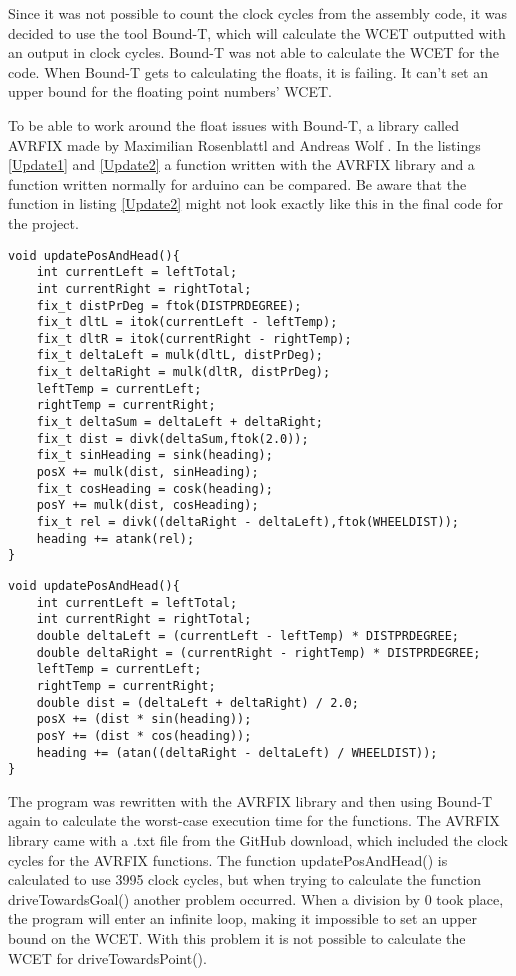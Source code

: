 Since it was not possible to count the clock cycles from the assembly code, it was decided to use the tool Bound-T, which will calculate the WCET outputted with an output in clock cycles. \newline
Bound-T was not able to calculate the WCET for the code. When Bound-T gets to calculating the floats, it is failing. It can't set an upper bound for the floating point numbers' WCET.

To be able to work around the float issues with Bound-T, a library called AVRFIX made by Maximilian Rosenblattl and Andreas Wolf \citep{AVRFIX}. In the listings \ref{Update1} and \ref{Update2} a function written with the AVRFIX library and a function written normally for arduino can be compared. Be aware that the function in listing \ref{Update2} might not look exactly like this in the final code for the project. 

\begin{lstlisting}[caption={The function updatePosAndHead with AWRFIX library}, label={Update1}]
void updatePosAndHead(){
	int currentLeft = leftTotal;
	int currentRight = rightTotal;
	fix_t distPrDeg = ftok(DISTPRDEGREE);
	fix_t dltL = itok(currentLeft - leftTemp);
	fix_t dltR = itok(currentRight - rightTemp);
	fix_t deltaLeft = mulk(dltL, distPrDeg);
	fix_t deltaRight = mulk(dltR, distPrDeg);
	leftTemp = currentLeft;
	rightTemp = currentRight;
	fix_t deltaSum = deltaLeft + deltaRight;
	fix_t dist = divk(deltaSum,ftok(2.0));
	fix_t sinHeading = sink(heading);
	posX += mulk(dist, sinHeading);
	fix_t cosHeading = cosk(heading);
	posY += mulk(dist, cosHeading);
	fix_t rel = divk((deltaRight - deltaLeft),ftok(WHEELDIST));
	heading += atank(rel);
}
\end{lstlisting}

\begin{lstlisting}[caption={The function updatePosAndHead from the Arduino IDE}, label={Update2}]
void updatePosAndHead(){
	int currentLeft = leftTotal;
	int currentRight = rightTotal;
	double deltaLeft = (currentLeft - leftTemp) * DISTPRDEGREE;
	double deltaRight = (currentRight - rightTemp) * DISTPRDEGREE;
	leftTemp = currentLeft;
	rightTemp = currentRight;
	double dist = (deltaLeft + deltaRight) / 2.0;
	posX += (dist * sin(heading));
	posY += (dist * cos(heading));
	heading += (atan((deltaRight - deltaLeft) / WHEELDIST));
}
\end{lstlisting}

The program was rewritten with the AVRFIX library and then using Bound-T again to calculate the worst-case execution time for the functions. The AVRFIX library came with a .txt file from the GitHub download, which included the clock cycles for the AVRFIX functions. \newline
The function updatePosAndHead() is calculated to use 3995 clock cycles, but when trying to calculate the function driveTowardsGoal() another problem occurred. When a division by 0 took place, the program will enter an infinite loop, making it impossible to set an upper bound on the WCET. With this problem it is not possible to calculate the WCET for driveTowardsPoint().

